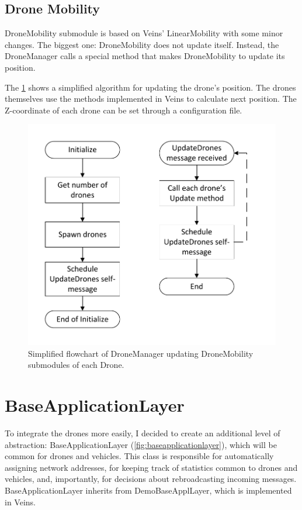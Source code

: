 \documentclass[]{nsm-thesis}
\begin{document}
\subsection{Drone Mobility}

DroneMobility submodule is based on Veins' LinearMobility with some minor changes. The biggest one: DroneMobility does not update itself. Instead, the DroneManager calls a special method that makes DroneMobility to update its position.

The \cref{fig:dronemanagerflow} shows a simplified algorithm for updating the drone's position. The drones themselves use the methods implemented in Veins to calculate next position. The Z-coordinate of each drone can be set through a configuration file.

\begin{figure}
	\centering
	\includegraphics[width=1\textwidth]{figures/DroneManager.pdf}
	\caption{Simplified flowchart of DroneManager updating DroneMobility submodules of each Drone.}
	\label{fig:dronemanagerflow}
\end{figure}



\section{BaseApplicationLayer}

To integrate the drones more easily, I decided to create an additional level of abstraction: BaseApplicationLayer (\cref{fig:baseapplicationlayer}), which will be common for drones and vehicles. This class is responsible for automatically assigning network addresses, for keeping track of statistics common to drones and vehicles, and, importantly, for decisions about rebroadcasting incoming messages. BaseApplicationLayer inherits from DemoBaseApplLayer, which is implemented in Veins.
\end{document}
